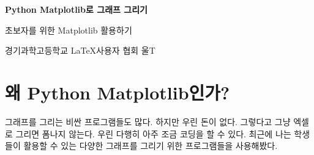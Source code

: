 \documentclass[12pt]{article}
\begin{document}
	
	{\bf \Huge Python Matplotlib로 그래프 그리기}
	
	\begin{LARGE}
		초보자를 위한 Matplotlib 활용하기
		\newline
		\newline
		\newline
		\newline
		\newline
	\end{LARGE} 


	
	
	\begin{flushright}
		\vfill \LARGE 경기과학고등학교 \LaTeX 사용자 협회 울T
	\end{flushright}
	
	\clearpage
	\clearpage
	
	\section{왜 Python Matplotlib인가?}
	그래프를 그리는 비싼 프로그램들도 많다. 하지만 우린 돈이 없다. 그렇다고 그냥 엑셀로 그리면 폼나지 않는다. 우린 다행히 아주 조금 코딩을 할 수 있다. 최근에 나는 학생들이 활용할 수 있는 다양한 그래프를 그리기 위한 프로그램들을 사용해봤다.
	
\end{document}

